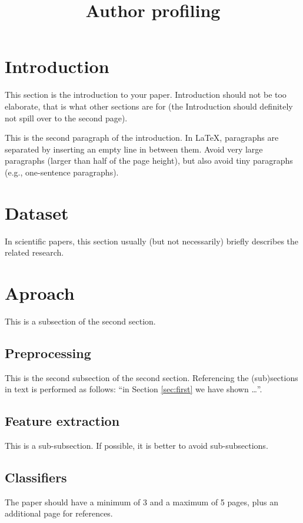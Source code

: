 \documentclass[10pt, a4paper]{article}
\title{ Author profiling}
\begin{document}
\maketitleabstract

\section{Introduction}

This section is the introduction to your paper. Introduction should not be too elaborate, that is what other sections are for (the Introduction should definitely not spill over to the second page). 

This is the second paragraph of the introduction. In \LaTeX , paragraphs are separated by inserting an empty line in between them.  Avoid very large paragraphs (larger than half of the page height), but also avoid tiny paragraphs (e.g., one-sentence paragraphs).

\section{Dataset}

In scientific papers, this section usually (but not necessarily) briefly describes the related research. 

\section{Aproach}


This is a subsection of the second section.

\subsection{Preprocessing}

This is the second subsection of the second section. Referencing the (sub)sections in text is performed as follows: ``in Section \ref{sec:first} we have shown \dots''.

\subsection{Feature extraction} 

This is a sub-subsection. If possible, it is better to avoid sub-subsections. 

\subsection{Classifiers}

The paper should have a minimum of 3 and a maximum of 5 pages, plus an additional page for references.
\end{document}
